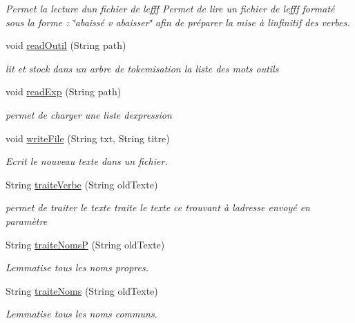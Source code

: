 \begin{DoxyCompactItemize}
\begin{DoxyCompactList}\small\item\em Permet la lecture d\textquotesingle{}un fichier de lefff  Permet de lire un fichier de lefff formaté sous la forme \+: \char`\"{}abaissé v abaisser\char`\"{} afin de préparer la mise à l\textquotesingle{}infinitif des verbes. \end{DoxyCompactList}\item 
void \hyperlink{classlemmatiseur_1_1_lefff_a48899a55b2983f821e346c41e79cca57}{read\+Outil} (String path)
\begin{DoxyCompactList}\small\item\em lit et stock dans un arbre de tokemisation la liste des mots outils \end{DoxyCompactList}\item 
void \hyperlink{classlemmatiseur_1_1_lefff_ac4995f4c26e16a76bad05717f76ca02b}{read\+Exp} (String path)
\begin{DoxyCompactList}\small\item\em permet de charger une liste d\textquotesingle{}expression \end{DoxyCompactList}\item 
void \hyperlink{classlemmatiseur_1_1_lefff_a6ebf55fecc00be5f61244df5c4fda22d}{write\+File} (String txt, String titre)
\begin{DoxyCompactList}\small\item\em Ecrit le nouveau texte dans un fichier. \end{DoxyCompactList}\item 
String \hyperlink{classlemmatiseur_1_1_lefff_a5e2d391b8f53b44d5f5b29ed88e91cb4}{traite\+Verbe} (String old\+Texte)
\begin{DoxyCompactList}\small\item\em permet de traiter le texte  traite le texte ce trouvant à l\textquotesingle{}adresse envoyé en paramètre \end{DoxyCompactList}\item 
String \hyperlink{classlemmatiseur_1_1_lefff_a804181727af6d5191723cdd912bfe4e5}{traite\+NomsP} (String old\+Texte)
\begin{DoxyCompactList}\small\item\em Lemmatise tous les noms propres. \end{DoxyCompactList}\item 
String \hyperlink{classlemmatiseur_1_1_lefff_a40ef9d9224922b3b85a77ab00ec3ae11}{traite\+Noms} (String old\+Texte)
\begin{DoxyCompactList}\small\item\em Lemmatise tous les noms communs. \end{DoxyCompactList}\item 

\end{DoxyCompactItemize}
